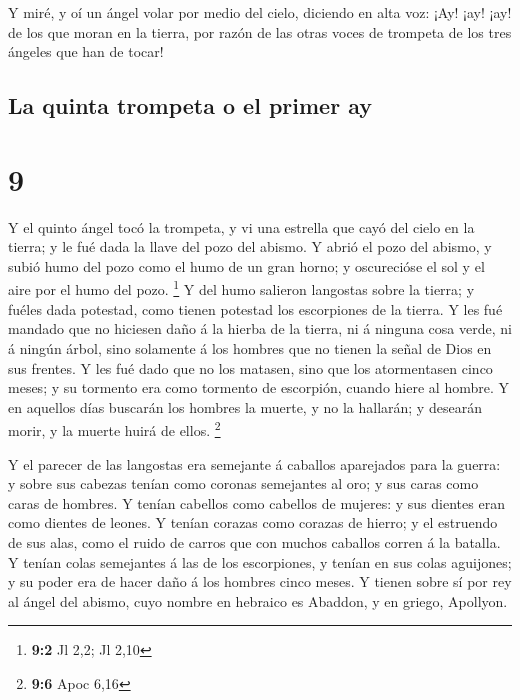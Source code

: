  Y miré, y oí un ángel volar por medio del cielo,
diciendo en alta voz: ¡Ay! ¡ay! ¡ay! de los que moran en la tierra, por
razón de las otras voces de trompeta de los tres ángeles que han de
tocar!

\hypertarget{la-quinta-trompeta-o-el-primer-ay}{%
\subsection{La quinta trompeta o el primer
ay}\label{la-quinta-trompeta-o-el-primer-ay}}

\hypertarget{section-8}{%
\section{9}\label{section-8}}

 Y el quinto ángel tocó la trompeta, y vi una estrella que
cayó del cielo en la tierra; y le fué dada la llave del pozo del abismo.
 Y abrió el pozo del abismo, y subió humo del pozo como el
humo de un gran horno; y oscurecióse el sol y el aire por el humo del
pozo. \footnote{\textbf{9:2} Jl 2,2; Jl 2,10}  Y del humo
salieron langostas sobre la tierra; y fuéles dada potestad, como tienen
potestad los escorpiones de la tierra.  Y les fué mandado
que no hiciesen daño á la hierba de la tierra, ni á ninguna cosa verde,
ni á ningún árbol, sino solamente á los hombres que no tienen la señal
de Dios en sus frentes.  Y les fué dado que no los
matasen, sino que los atormentasen cinco meses; y su tormento era como
tormento de escorpión, cuando hiere al hombre.  Y en
aquellos días buscarán los hombres la muerte, y no la hallarán; y
desearán morir, y la muerte huirá de ellos. \footnote{\textbf{9:6} Apoc
  6,16}

 Y el parecer de las langostas era semejante á caballos
aparejados para la guerra: y sobre sus cabezas tenían como coronas
semejantes al oro; y sus caras como caras de hombres.  Y
tenían cabellos como cabellos de mujeres: y sus dientes eran como
dientes de leones.  Y tenían corazas como corazas de
hierro; y el estruendo de sus alas, como el ruido de carros que con
muchos caballos corren á la batalla.  Y tenían colas
semejantes á las de los escorpiones, y tenían en sus colas aguijones; y
su poder era de hacer daño á los hombres cinco meses.  Y
tienen sobre sí por rey al ángel del abismo, cuyo nombre en hebraico es
Abaddon, y en griego, Apollyon.

